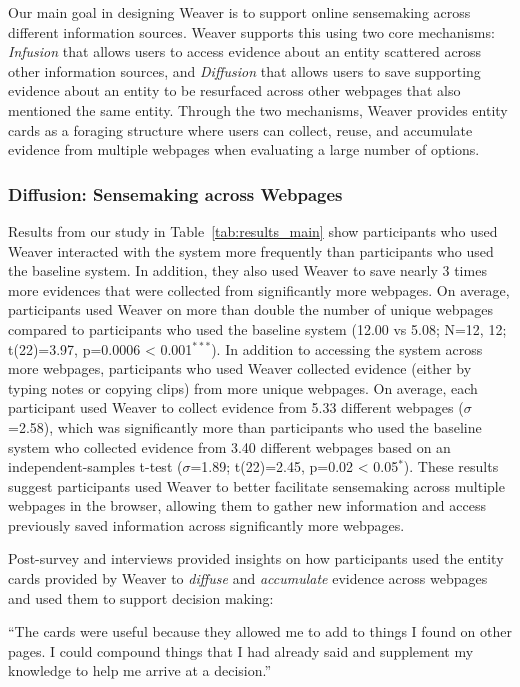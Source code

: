 Our main goal in designing Weaver is to support online sensemaking across different information sources.
Weaver supports this using two core mechanisms: \emph{Infusion} that allows users to access evidence about an entity scattered across other information sources, and \emph{Diffusion} that allows users to save supporting evidence about an entity to be resurfaced across other webpages that also mentioned the same entity. Through the two mechanisms, Weaver provides entity cards as a foraging structure where users can collect, reuse, and accumulate evidence from multiple webpages when evaluating a large number of options.

\subsubsection{Diffusion: Sensemaking across Webpages}

Results from our study in Table~\ref{tab:results_main} show participants who used Weaver interacted with the system more frequently than participants who used the baseline system. In addition, they also used Weaver to save nearly 3 times more evidences that were collected from significantly more webpages. On average, participants used Weaver on more than double the number of unique webpages compared to participants who used the baseline system (12.00 vs 5.08; N=12, 12; t(22)=3.97, p=0.0006 < 0.001$^{***}$).
In addition to accessing the system across more webpages, participants who used Weaver collected evidence (either by typing notes or copying clips) from more unique webpages. On average, each participant used Weaver to collect evidence from 5.33 different webpages ($\sigma$=2.58), which was significantly more than participants who used the baseline system who collected evidence from 3.40 different webpages based on an independent-samples t-test ($\sigma$=1.89; t(22)=2.45, p=0.02 < 0.05$^{*}$).
These results suggest participants used Weaver to better facilitate sensemaking across multiple webpages in the browser, allowing them to gather new information and access previously saved information across significantly more webpages.

Post-survey and interviews provided insights on how participants used the entity cards provided by Weaver to \emph{diffuse} and \emph{accumulate} evidence across webpages and used them to support decision making: 

\begin{tightquote}
``The cards were useful because they allowed me to add to things I found on other pages.
I could compound things that I had already said and supplement my knowledge to help me arrive at a decision.''
\end{tightquote}

